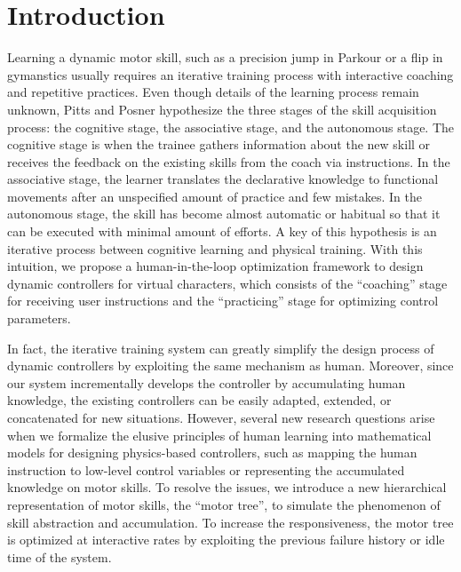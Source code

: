 \chapter{Introduction}

Learning a dynamic motor skill, such as a precision jump in Parkour or
a flip in gymanstics usually requires an iterative training process
with interactive coaching and repetitive practices.
Even though details of the learning process remain unknown,
Pitts and Posner \cite{fitts:1967:hp} hypothesize the three stages
of the skill acquisition process: the cognitive stage, 
the associative stage, and the autonomous stage.
The cognitive stage is when the trainee gathers information about the new
skill or receives the feedback on the existing skills from the coach
via instructions.
In the associative stage, the learner translates the declarative knowledge
to functional movements after an unspecified amount of practice and few mistakes.
In the autonomous stage, the skill has become almost automatic or habitual 
so that it can be executed with minimal amount of efforts.
A key of this hypothesis is an iterative process between cognitive learning
and physical training.
With this intuition, we propose a human-in-the-loop optimization 
framework to design dynamic controllers for virtual characters,
which consists of the ``coaching'' stage for receiving user instructions 
and the ``practicing'' stage for optimizing control parameters.

In fact, the iterative training system can greatly simplify the design
process of dynamic controllers by exploiting the same mechanism as human.
Moreover, since our system incrementally develops the controller by
accumulating human knowledge, the existing controllers can be easily
adapted, extended, or concatenated for new situations.
However, several new research questions arise when we formalize the
elusive principles of human learning into mathematical models for
designing physics-based controllers, such as mapping the human instruction
to low-level control variables or representing the accumulated knowledge
on motor skills.
To resolve the issues, we introduce a new hierarchical representation 
of motor skills, the ``motor tree'', to simulate the phenomenon of
skill abstraction and accumulation. 
To increase the responsiveness, the motor tree is optimized at interactive
rates by exploiting the previous failure history or idle time of the system.

